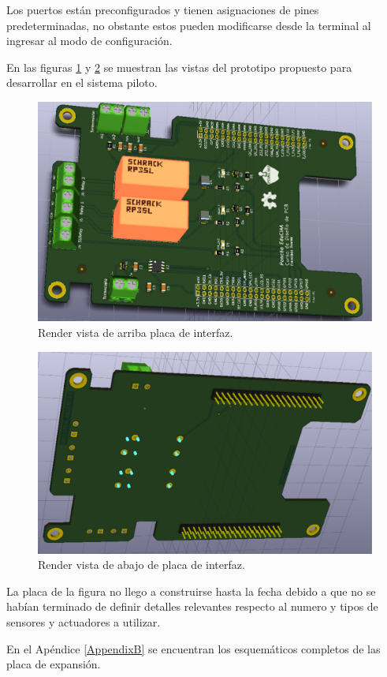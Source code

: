 Los puertos están preconfigurados y tienen asignaciones de pines predeterminadas, no obstante estos pueden modificarse desde la terminal al ingresar al modo de configuración.

En las figuras \ref{fig:renderPonchoTOP} y \ref{fig:renderPonchoBOT} se muestran las vistas del prototipo propuesto para desarrollar en el sistema piloto. 

\begin{figure}[h!]
	\centering
	\includegraphics[width=.7\textwidth]{Figures/Cap_3/tempRelayPoncho_TOP}
	\caption{Render vista de arriba placa de interfaz.}
	\label{fig:renderPonchoTOP}
\end{figure}

\begin{figure}[h!]
	\centering
	\includegraphics[width=.7\textwidth]{Figures/Cap_3/tempRelayPoncho_BOTTOM}
	\caption{Render vista de abajo de placa de interfaz.}
	\label{fig:renderPonchoBOT}
\end{figure}

La placa de la figura no llego a construirse hasta la fecha debido a que no se habían terminado de definir detalles relevantes respecto al numero y tipos de sensores y actuadores a utilizar.

En el Apéndice \ref{AppendixB} se encuentran los esquemáticos completos de las placa de expansión.
